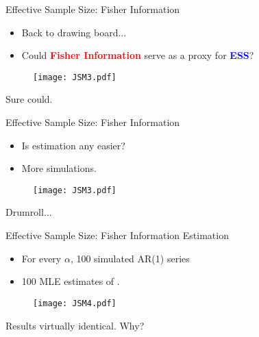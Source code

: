 \documentclass{beamer}
\begin{document}
\begin{frame}{Effective Sample Size: Fisher Information}  %
\begin{itemize}
\item Back to drawing board...
\item Could \textcolor{red}{\bf Fisher Information} serve as a proxy for \textcolor{blue}{\bf ESS}?
\end{itemize}

\begin{figure}
\centering
\texttt{[image: JSM3.pdf]}
\end{figure}

Sure could.

\end{frame}


\begin{frame}{Effective Sample Size: Fisher Information}  %
\begin{itemize}
\item Is estimation any easier?
\item More simulations.
\end{itemize}

\begin{figure}
\centering
\texttt{[image: JSM3.pdf]}
\end{figure}

Drumroll...

\end{frame}



\begin{frame}{Effective Sample Size: Fisher Information Estimation}  %
\begin{itemize}
\item For every  $\alpha$, 100 simulated AR(1) series
\item 100 MLE estimates of .
\end{itemize}

\begin{figure}
\centering
\texttt{[image: JSM4.pdf]}
\end{figure}

Results virtually identical. Why?

\end{frame}
\end{document}

